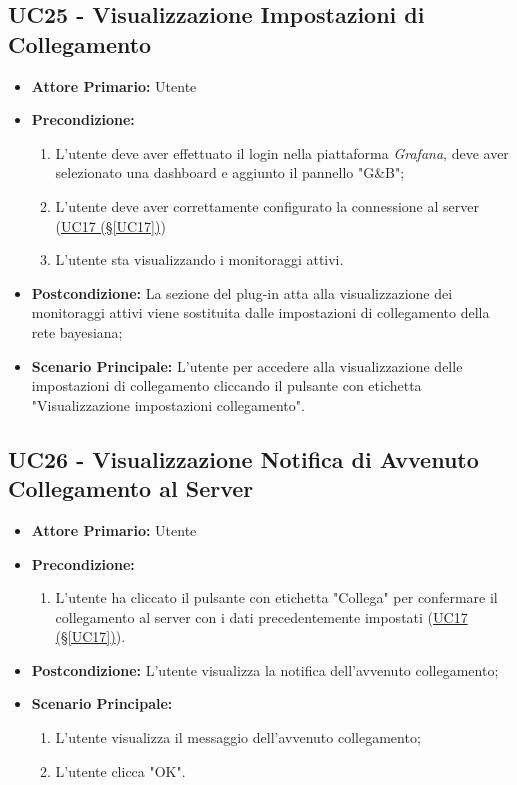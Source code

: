 \pagebreak

\subsection{UC25 - Visualizzazione Impostazioni di Collegamento}\label{UC25}
\begin{itemize}
	\item \textbf{Attore Primario:} Utente
	\item \textbf{Precondizione:} 
	\begin{enumerate}
		\item L'utente deve aver effettuato il login nella piattaforma \textit{Grafana}, deve aver selezionato una dashboard e aggiunto il pannello "G\&B";
		\item L'utente deve aver correttamente configurato la connessione al server (\hyperref[UC17]{UC17 (§\ref*{UC17})})
		\item L'utente sta visualizzando i monitoraggi attivi.
	\end{enumerate}
	\item \textbf{Postcondizione:} La sezione del plug-in atta alla visualizzazione dei monitoraggi attivi viene sostituita dalle impostazioni di collegamento della rete bayesiana;
	\item \textbf{Scenario Principale:} L'utente per accedere alla visualizzazione delle impostazioni di collegamento cliccando il pulsante con etichetta "Visualizzazione impostazioni collegamento".
\end{itemize}

\pagebreak

\subsection{UC26 - Visualizzazione Notifica di Avvenuto Collegamento al Server}\label{UC26}

\begin{itemize}
	\item \textbf{Attore Primario:}  Utente
	\item \textbf{Precondizione:}
	\begin{enumerate}
		\item L'utente ha cliccato il pulsante con etichetta "Collega" per confermare il collegamento al server con i dati precedentemente impostati (\hyperref[UC17]{UC17 (§\ref*{UC17})}).
	\end{enumerate}
	\item \textbf{Postcondizione:} L'utente visualizza la notifica dell'avvenuto collegamento;
	\item \textbf{Scenario Principale:}
	\begin{enumerate}
		\item L'utente visualizza il messaggio dell'avvenuto collegamento;
		\item L'utente clicca "OK".
	\end{enumerate}
\end{itemize}
